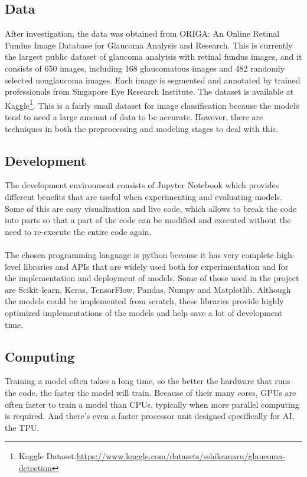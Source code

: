 \documentclass[11pt, a4paper]{article}
\begin{document}
\subsection{Data}
After investigation, the data was obtained from ORIGA: An Online Retinal Fundus Image Database for Glaucoma Analysis and Research. This is currently the largest public dataset of glaucoma analyisis with retinal fundus images, and it consists of 650 images, including 168 glaucomatous images and 482 randomly selected nonglaucoma images. Each image is segmented and annotated by trained professionals from Singapore Eye Research Institute. The dataset is available at Kaggle\footnote{Kaggle Dataset:\url{https://www.kaggle.com/datasets/sshikamaru/glaucoma-detection}}. This is a fairly small dataset for image classification because the models tend to need a large amount of data to be accurate. However, there are techniques in both the preprocessing and modeling stages to deal with this.
\subsection{Development}
The development environment consists of Jupyter Notebook which provides different benefits that are useful when experimenting and evaluating models. Some of this are easy visualization and live code, which allows to break the code into parts so that a part of the code can be modified and executed without the need to re-execute the entire code again.
\\
\\
The chosen programming language is python because it has very complete high-level libraries and APIs that are widely used both for experimentation and for the implementation and deployment of models. Some of those used in the project are Scikit-learn, Keras, TensorFlow, Pandas, Numpy and Matplotlib. Although the models could be implemented from scratch, these libraries provide highly optimized implementations of the models and help save a lot of development time.
\subsection{Computing}
Training a model often takes a long time, so the better the hardware that runs the code, the faster the model will train. Because of their many cores, GPUs are often faster to train a model than CPUs, typically when more parallel computing is required. And there's even a faster processor unit designed specifically for AI, the TPU.
\end{document}
